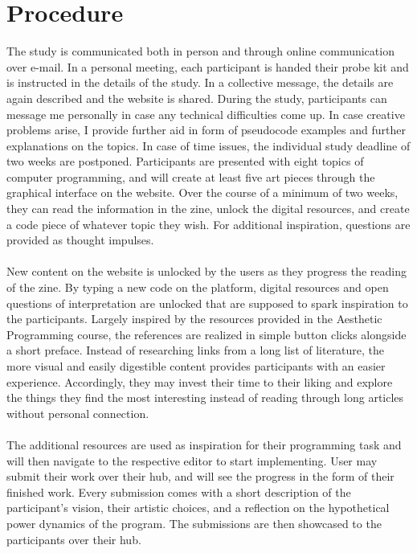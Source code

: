 
\section{Procedure}
The study is communicated both in person and through online communication over e-mail. In a personal meeting, each participant is handed their probe kit and is instructed in the details of the study. In a collective message, the details are again described and the website is shared. During the study, participants can message me personally in case any technical difficulties come up. In case creative problems arise, I provide further aid in form of pseudocode examples and further explanations on the topics. In case of time issues, the individual study deadline of two weeks are postponed. 
Participants are presented with eight topics of computer programming, and will create at least five art pieces through the graphical interface on the website. Over the course of a minimum of two weeks, they can read the information in the zine, unlock the digital resources, and create a code piece of whatever topic they wish. For additional inspiration, questions are provided as thought impulses. \\ \\
New content on the website is unlocked by the users as they progress the reading of the zine. By typing a new code on the platform, digital resources and open questions of interpretation are unlocked that are supposed to spark inspiration to the participants. Largely inspired by the resources provided in the Aesthetic Programming course, the references are realized in simple button clicks alongside a short preface. Instead of researching links from a long list of literature, the more visual and easily digestible content provides participants with an easier experience. Accordingly, they may invest their time to their liking and explore the things they find the most interesting instead of reading through long articles without personal connection. \\ \\
The additional resources are used as inspiration for their programming task and will then navigate to the respective editor to start implementing. User may submit their work over their hub, and will see the progress in the form of their finished work. Every submission comes with a short description of the participant’s vision, their artistic choices, and a reflection on the hypothetical power dynamics of the program. The submissions are then showcased to the participants over their hub. \\ \\ 
